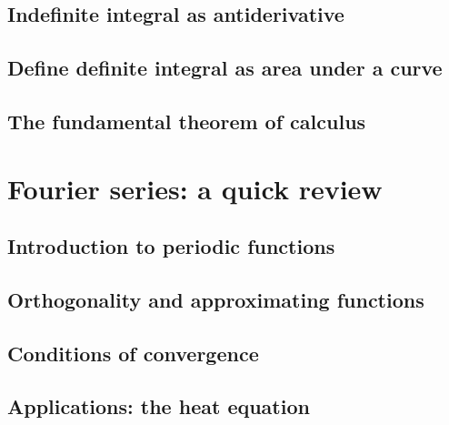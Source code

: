 \documentclass{book}
\begin{document}
\section{Indefinite integral as antiderivative}

\section{Define definite integral as area under a curve}

\section{The fundamental theorem of calculus}

\chapter{Fourier series: a quick review}

\section{Introduction to periodic functions}

\section{Orthogonality and approximating functions}

\section{Conditions of convergence}

\section{Applications: the heat equation}

\backmatter
 
\end{document}
